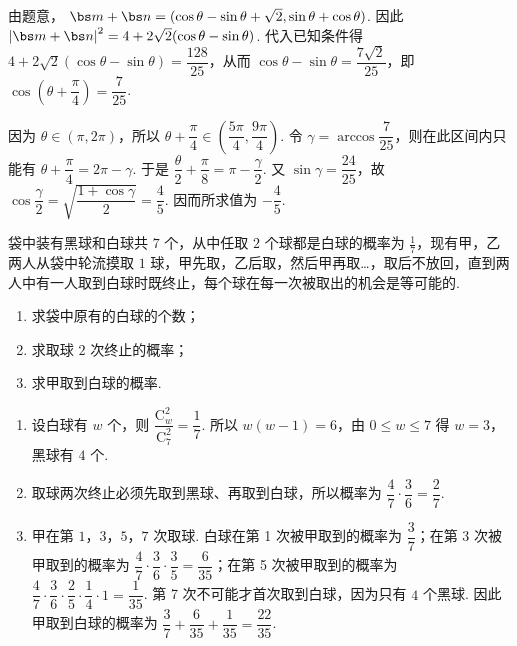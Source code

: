 \begin{solution}
由题意，
\(\bs m+\bs n=(\cos\theta-\sin\theta+\sqrt2,\sin\theta+\cos\theta)\). 因此
\(\left|\bs m+\bs n\right|^2=4+2\sqrt2(\cos\theta-\sin\theta)\). 代入已知条件得
\(4+2\sqrt2(\cos\theta-\sin\theta)=\dfrac{128}{25}\)，从而 \(\cos\theta-\sin\theta=\dfrac{7\sqrt2}{25}\)，即
\(\cos\left(\theta+\dfrac\pi4\right)=\dfrac7{25}\).

因为 \(\theta\in(\pi,2\pi)\)，所以 \(\theta+\dfrac\pi4\in\left(\dfrac{5\pi}{4},\dfrac{9\pi}{4}\right)\). 令 \(\gamma=\arccos\dfrac7{25}\)，则在此区间内只能有 \(\theta+\dfrac\pi4=2\pi-\gamma\). 于是
\(\dfrac\theta2+\dfrac\pi8=\pi-\dfrac\gamma2\). 又 \(\sin\gamma=\dfrac{24}{25}\)，故
\(\cos\dfrac\gamma2=\sqrt{\dfrac{1+\cos\gamma}{2}}=\dfrac45\). 因而所求值为 \(-\dfrac45\).
\end{solution}

\begin{problem}
袋中装有黑球和白球共 \(7\) 个，从中任取 \(2\) 个球都是白球的概率为 \(\frac{1}{7}\)，现有甲，乙两人从袋中轮流摸取 \(1\) 球，甲先取，乙后取，然后甲再取…，取后不放回，直到两人中有一人取到白球时既终止，每个球在每一次被取出的机会是等可能的.

\begin{enumerate}
\item 求袋中原有的白球的个数；
\item 求取球 \(2\) 次终止的概率；
\item 求甲取到白球的概率.
\end{enumerate}
\end{problem}

\begin{solution}
\begin{enumerate}
\item 设白球有 \(w\) 个，则 \(\dfrac{\mathrm C_w^2}{\mathrm C_7^2}=\dfrac17\). 所以 \(w(w-1)=6\)，由 \(0\leqslant w\leqslant7\) 得 \(w=3\)，黑球有 \(4\) 个.
\item 取球两次终止必须先取到黑球、再取到白球，所以概率为 \(\dfrac47\cdot\dfrac36=\dfrac27\).
\item 甲在第 \(1\)，\(3\)，\(5\)，\(7\) 次取球. 白球在第 1 次被甲取到的概率为 \(\dfrac37\)；在第 3 次被甲取到的概率为 \(\dfrac47\cdot\dfrac36\cdot\dfrac35=\dfrac6{35}\)；在第 5 次被甲取到的概率为 \(\dfrac47\cdot\dfrac36\cdot\dfrac25\cdot\dfrac14\cdot1=\dfrac1{35}\). 第 7 次不可能才首次取到白球，因为只有 \(4\) 个黑球. 因此甲取到白球的概率为 \(\dfrac37+\dfrac6{35}+\dfrac1{35}=\dfrac{22}{35}\).
\end{enumerate}
\end{solution}

